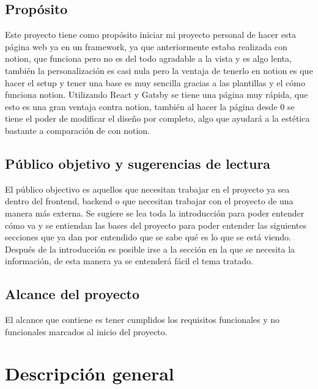 \documentclass{scrreprt}
\begin{document}
		\section{Propósito}
		Este proyecto tiene como propósito iniciar mi proyecto personal de hacer esta página web ya en un framework, ya que anteriormente estaba realizada con notion, que funciona pero no es del todo agradable a la vista y es algo lenta, también la personalización es casi nula pero la ventaja de tenerlo en notion es que hacer el setup y tener una base es muy sencilla gracias a las plantillas y el cómo funciona notion. Utilizando React y Gatsby se tiene una página muy rápida, que esto es una gran ventaja contra notion, también al hacer la página desde 0 se tiene el poder de modificar el diseño por completo, algo que ayudará a la estética bastante a comparación de con notion.\\
	
		\section{Público objetivo y sugerencias de lectura}
	El público objectivo es aquellos que necesitan trabajar en el proyecto ya sea dentro del frontend, backend o que necesitan trabajar con el proyecto de una manera más externa.
Se sugiere se lea toda la introducción para poder entender cómo va y se entiendan las bases del proyecto para poder entender las siguientes secciones que ya dan por entendido que se sabe qué es lo que se está viendo. Después de la introducción es posible irse a la sección en la que se necesita la información, de esta manera ya se entenderá fácil el tema tratado.\\
	
		\section{Alcance del proyecto}
	El alcance que contiene es tener cumplidos los requisitos funcionales y no funcionales marcados al inicio del proyecto.
	
	
	\chapter{Descripción general}
	
\end{document}
